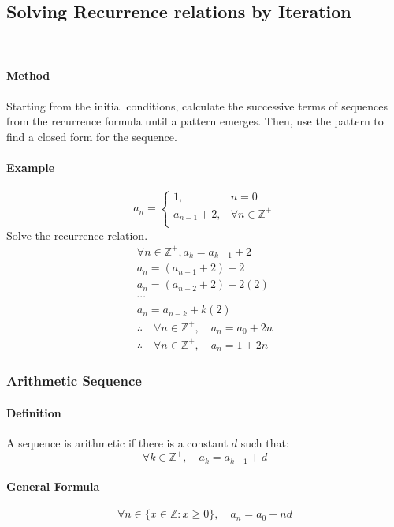 \subsection{Solving Recurrence relations by Iteration}
\hrulefill\\
\paragraph*{Method}
Starting from the initial conditions, calculate the successive terms of sequences from the recurrence formula until a pattern emerges. 
Then, use the pattern to find a closed form for the sequence.

\paragraph*{Example}
\begin{equation*}
    a_n =
    \begin{cases}
        1, & n = 0\\
        a_{n-1} + 2, & \forall n \in \mathbb{Z}^+\\
    \end{cases}
\end{equation*}
Solve the recurrence relation.
\begin{align*}
    \forall n \in \mathbb{Z}^+, a_k = a_{k-1} + 2\\
    a_n = (a_{n-1} + 2) + 2\\
    a_n = (a_{n-2} + 2) + 2(2)\\
    \cdots\\
    a_n = a_{n-k} + k(2)\\
    \therefore \quad \forall n \in \mathbb{Z}^+, \quad a_n = a_0 + 2n\\
    \therefore \quad \forall n \in \mathbb{Z}^+, \quad a_n = 1 + 2n
\end{align*}

\subsubsection*{Arithmetic Sequence}
\paragraph*{Definition}
A sequence is arithmetic if there is a constant $d$ such that:
\begin{equation*}
    \forall k \in \mathbb{Z}^+, \quad  a_k = a_{k-1} + d
\end{equation*}
\paragraph*{General Formula}
\begin{equation*}
    \forall n \in \{x \in \mathbb{Z} : x \geq 0\}, \quad a_n = a_0 + nd
\end{equation*}

